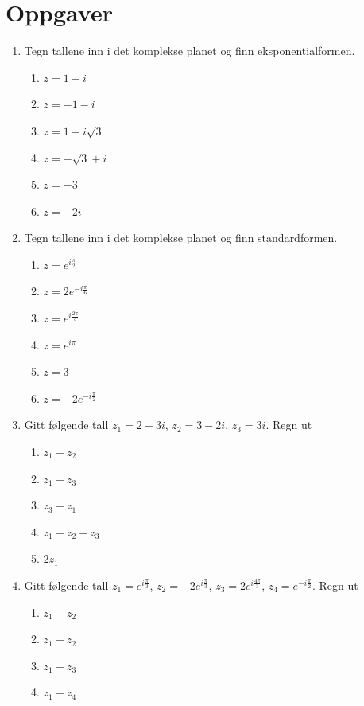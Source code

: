 \documentclass[a4paper,norsk,12pt]{article}
\begin{document}
\section{Oppgaver}
\footnotesize{
\begin{multicols}{2}
\begin{enumerate}
\item
Tegn tallene inn i det komplekse planet og finn eksponentialformen.
\begin{enumerate}[label=\alph*)]
\item
$z = 1 + i$
\item
$z = -1-i$
\item
$z= 1 + i\sqrt{3}$
\item
$z = -\sqrt{3} + i$
\item
$z = -3$
\item
$z = -2i$
\end{enumerate}
\item
Tegn tallene inn i det komplekse planet og finn standardformen.
\begin{enumerate}[label=\alph*)]
\item
$z = e^{i\frac{\pi}{2}}$
\item
$z=2e^{-i\frac{\pi}{6}}$
\item
$z = e^{i\frac{2\pi}{3}}$
\item
$z = e^{i\pi}$
\item
$z = 3$
\item
$z = -2e^{-i\frac{\pi}{2}}$
\end{enumerate}
\item
Gitt følgende tall $z_1 = 2+3i$, $z_2=3-2i$, $z_3 = 3i$. Regn ut
\begin{enumerate}[label=\alph*)]
\item
$z_1+z_2$
\item
$z_1+z_3$
\item
$z_3-z_1$
\item
$z_1-z_2+z_3$
\item
$2z_1$
\end{enumerate}
\item
Gitt følgende tall $z_1 = e^{i\frac{\pi}{3}}$, $z_2 = -2e^{i\frac{\pi}{3}}$, $z_3 = 2e^{i\frac{4\pi}{3}}$, $z_4 = e^{-i\frac{\pi}{2}}$. Regn ut
\begin{enumerate}[label=\alph*)]
\item
$z_1 + z_2$
\item
$z_1 - z_2$
\item
$z_1+z_3$
\item
$z_1-z_4$
\end{enumerate}

\end{enumerate}
\end{multicols}}
\end{document}
